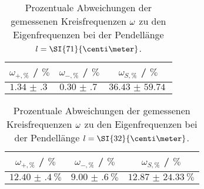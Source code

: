 \begin{table}
    \centering
    \caption{Prozentuale Abweichungen der gemessenen Kreisfrequenzen $\protect \omega$ zu den Eigenfrequenzen bei der Pendellänge $\protect l = \SI{71}{\centi\meter}$.}
    \label{tab:proz71}
    \begin{tabular}{c |c |c}
        \toprule
        $\omega_{+{,}\si{\percent}}$ / $\si{\percent}$  & $\omega_{-{,}\si{\percent}}$ / $\si{\percent}$ & $\omega_{S{,}\si{\percent}}$ / $\si{\percent}$\\
        \midrule
        $\SI{1.34(30)}{}$   &  $\SI{0.30(70)}{}$   & $\SI{36.43(5974)}{}$\\
        \bottomrule
    \end{tabular}
\end{table}

\begin{table}
    \centering
    \caption{Prozentuale Abweichungen der gemessenen Kreisfrequenzen $\protect \omega$ zu den Eigenfrequenzen bei der Pendellänge $\protect l = \SI{32}{\centi\meter}$.}
    \label{tab:proz32}
    \begin{tabular}{c |c |c}
        \toprule
        $\omega_{+{,}\si{\percent}}$ / $\si{\percent}$  & $\omega_{-{,}\si{\percent}}$ / $\si{\percent}$ & $\omega_{S{,}\si{\percent}}$ / $\si{\percent}$\\
        \midrule
        $\SI{12.40(40)}{\percent}$   &  $\SI{9.00(60)}{\percent}$  & $\SI{12.87(2433)}{\percent}$\\
        \bottomrule
    \end{tabular}
\end{table}


